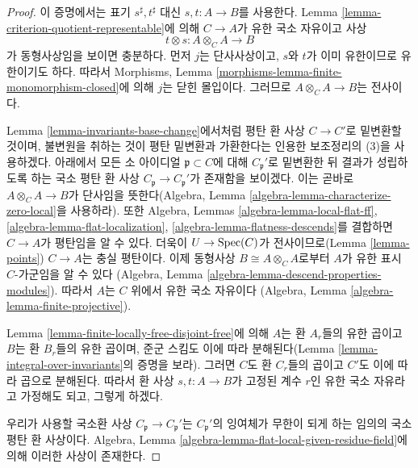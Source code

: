 \begin{proof}
이 증명에서는 표기 $s^\sharp, t^\sharp$ 대신 $s, t : A \to B$를 사용한다.
Lemma \ref{lemma-criterion-quotient-representable}에 의해 $C \to A$가 유한 국소 자유이고 사상
$$
t \otimes s : A \otimes_C A \longrightarrow B
$$
가 동형사상임을 보이면 충분하다. 먼저 $j$는 단사사상이고, $s$와 $t$가 이미 유한이므로 유한이기도 하다.
따라서 Morphisms, Lemma \ref{morphisms-lemma-finite-monomorphism-closed}에 의해 $j$는 닫힌 몰입이다.
그러므로 $A \otimes_C A \to B$는 전사이다.

\medskip\noindent
Lemma \ref{lemma-invariants-base-change}에서처럼 평탄 환 사상 $C \to C'$로 밑변환할 것이며,
불변원을 취하는 것이 평탄 밑변환과 가환한다는 인용한 보조정리의 (3)을 사용하겠다.
아래에서 모든 소 아이디얼 $\mathfrak p \subset C$에 대해 $C_{\mathfrak p}'$로 밑변환한 뒤 결과가 성립하도록 하는
국소 평탄 환 사상 $C_{\mathfrak p} \to C_{\mathfrak p}'$가 존재함을 보이겠다. 이는 곧바로
$A \otimes_C A \to B$가 단사임을 뜻한다(Algebra, Lemma \ref{algebra-lemma-characterize-zero-local}을 사용하라).
또한 Algebra, Lemmas \ref{algebra-lemma-local-flat-ff}, \ref{algebra-lemma-flat-localization},
\ref{algebra-lemma-flatness-descends}를 결합하면 $C \to A$가 평탄임을 알 수 있다.
더욱이 $U \to \mathop{\mathrm{Spec}}(C)$가 전사이므로(Lemma \ref{lemma-points}) $C \to A$는 충실 평탄이다.
이제 동형사상 $B \cong A \otimes_C A$로부터 $A$가 유한 표시 $C$-가군임을 알 수 있다
(Algebra, Lemma \ref{algebra-lemma-descend-properties-modules}). 따라서 $A$는 $C$ 위에서 유한 국소 자유이다
(Algebra, Lemma \ref{algebra-lemma-finite-projective}).

\medskip\noindent
Lemma \ref{lemma-finite-locally-free-disjoint-free}에 의해 $A$는 환 $A_r$들의 유한 곱이고 $B$는 환 $B_r$들의 유한 곱이며,
준군 스킴도 이에 따라 분해된다(Lemma \ref{lemma-integral-over-invariants}의 증명을 보라).
그러면 $C$도 환 $C_r$들의 곱이고 $C'$도 이에 따라 곱으로 분해된다. 따라서 환 사상 $s, t : A \to B$가
고정된 계수 $r$인 유한 국소 자유라고 가정해도 되고, 그렇게 하겠다.

\medskip\noindent
우리가 사용할 국소환 사상 $C_{\mathfrak p} \to C_{\mathfrak p}'$는 $C_{\mathfrak p}'$의 잉여체가 무한이 되게 하는
임의의 국소 평탄 환 사상이다. Algebra, Lemma \ref{algebra-lemma-flat-local-given-residue-field}에 의해 이러한 사상이 존재한다.


\end{proof}
